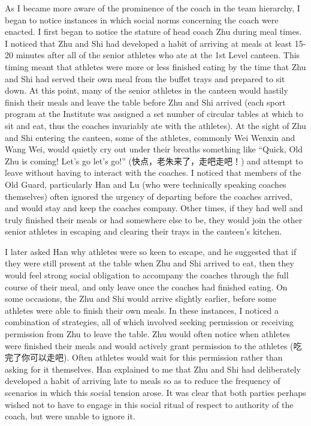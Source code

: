 \begin{CJK}{UTF8}{gbsn}
As I became more aware of the prominence of the coach in the team hierarchy, I began to notice instances in which social norms concerning the coach were enacted.  I first began to notice the stature of head coach Zhu during meal times.  I noticed that Zhu and Shi had developed a habit of arriving at meals at least 15-20 minutes after all of the senior athletes who ate at the 1st Level canteen.  This timing meant that athletes were more or less finished eating by the time that Zhu and Shi had served their own meal from the buffet trays and prepared to sit down.  At this point, many of the senior athletes in the canteen would hastily finish their meals and leave the table before Zhu and Shi arrived (each sport program at the Institute was assigned a set number of circular tables at which to sit and eat, thus the coaches invariably ate with the athletes). At the sight of Zhu and Shi entering the canteen, some of the athletes, commonly Wei Wenxin and Wang Wei, would quietly cry out under their breaths something like ``Quick, Old Zhu is coming!  Let's go let's go!'' (快点，老朱来了，走吧走吧！) and attempt to leave without having to interact with the coaches.  I noticed that members of the Old Guard, particularly Han and Lu (who were technically speaking coaches themselves) often ignored the urgency of departing before the coaches arrived, and would stay and keep the coaches company. Other times, if they had well and truly finished their meals or had somewhere else to be, they would join the other senior athletes in escaping and clearing their trays in the canteen's kitchen.

I later asked Han why athletes were so keen to escape, and he suggested that if they were still present at the table when Zhu and Shi arrived to eat, then they would feel strong social obligation to accompany the coaches through the full course of their meal, and only leave once the coaches had finished eating.  On some occasions, the Zhu and Shi would arrive slightly earlier, before some athletes were able to finish their own meals.  In these instances, I noticed a combination of strategies, all of which involved seeking permission or receiving permission from Zhu to leave the table.  Zhu would often notice when athletes were finished their meals and would actively grant permission to the athletes (吃完了你可以走吧).  Often athletes would wait for this permission rather than asking for it themselves.  Han explained to me that Zhu and Shi had deliberately developed a habit of arriving late to meals so as to reduce the frequency of scenarios in which this social tension arose.  It was clear that both parties perhaps wished not to have to engage in this social ritual of respect to authority of the coach, but were unable to ignore it.


\end{CJK}
